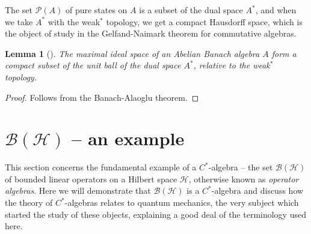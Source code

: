 \documentclass[11pt,a4paper]{report}
\theoremstyle{plain}
\newtheorem{lemma}{Lemma}
\theoremstyle{definition}
\newcommand{\1}{\mathbbm{1}}
\newcommand{\C}{\mathbb{C}}
\renewcommand{\H}{\mathcal{H}}
\newcommand{\B}{\mathcal{B}}
\renewcommand{\P}[1]{\mathscr{P}(#1)}
\begin{document}
The set $\P A$ of pure states on $A$ is a subset of the dual space $A^\ast$, and when we take $A^\ast$ with the weak$^\ast$ topology, we get a compact Hausdorff space, which is the object of study in the Gelfand-Naimark theorem for commutative algebras.

\begin{lemma}[{\cite[3.2.20]{kadison83}}]\label{lemma:3220}
	The maximal ideal space of an Abelian Banach algebra $A$ form a compact subset of the unit ball of 
	the dual space $A^\ast$, relative to the weak$^\ast$ topology.
\end{lemma}
\begin{proof}
	Follows from the Banach-Alaoglu theorem.
\end{proof}




\section{$\B(\H)$ -- an example}
This section concerns the fundamental example of a $C^\ast$-algebra -- the set $\B(\H)$ of bounded 
linear operators on a Hilbert space $\H$, otherwise known as \emph{operator algebras}. Here we will 
demonstrate that $\B(\H)$ is a $C^\ast$-algebra and discuss how the theory of $C^\ast$-algebras relates 
to quantum mechanics, the very subject which started the study of these objects, explaining a good deal 
of the terminology used here. 


\end{document}

